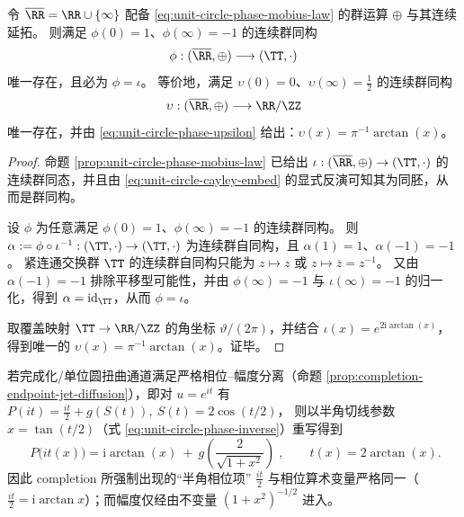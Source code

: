 \begin{corollary}\label{cor:unit-circle-phase-cayley-arctan-rigidity}
令 \(\overline{\RR}=\RR\cup\{\infty\}\) 配备 \eqref{eq:unit-circle-phase-mobius-law} 的群运算 \(\oplus\) 与其连续延拓。
则满足 \(\phi(0)=1\)、\(\phi(\infty)=-1\) 的连续群同构
\[
\phi:(\overline{\RR},\oplus)\longrightarrow (\TT,\cdot)
\]
唯一存在，且必为 \(\phi=\iota\)。
等价地，满足 \(\upsilon(0)=0\)、\(\upsilon(\infty)=\tfrac12\) 的连续群同构
\[
\upsilon:(\overline{\RR},\oplus)\longrightarrow \RR/\ZZ
\]
唯一存在，并由 \eqref{eq:unit-circle-phase-upsilon} 给出：\(\upsilon(x)=\pi^{-1}\arctan(x)\)。
\end{corollary}
\begin{proof}
命题 \ref{prop:unit-circle-phase-mobius-law} 已给出 \(\iota:(\overline{\RR},\oplus)\to(\TT,\cdot)\) 的连续群同态，并且由 \eqref{eq:unit-circle-cayley-embed} 的显式反演可知其为同胚，从而是群同构。
\par
设 \(\phi\) 为任意满足 \(\phi(0)=1\)、\(\phi(\infty)=-1\) 的连续群同构。
则 \(\alpha:=\phi\circ\iota^{-1}:(\TT,\cdot)\to(\TT,\cdot)\) 为连续群自同构，且 \(\alpha(1)=1\)、\(\alpha(-1)=-1\)。
紧连通交换群 \(\TT\) 的连续群自同构只能为 \(z\mapsto z\) 或 \(z\mapsto \overline{z}=z^{-1}\)。
又由 \(\alpha(-1)=-1\) 排除平移型可能性，并由 \(\phi(\infty)=-1\) 与 \(\iota(\infty)=-1\) 的归一化，得到 \(\alpha=\mathrm{id}_{\TT}\)，从而 \(\phi=\iota\)。
\par
取覆盖映射 \(\TT\to \RR/\ZZ\) 的角坐标 \(\vartheta/(2\pi)\)，并结合 \(\iota(x)=e^{2\mathrm{i}\arctan(x)}\)，得到唯一的 \(\upsilon(x)=\pi^{-1}\arctan(x)\)。证毕。
\end{proof}

\begin{remark}\label{rem:unit-circle-phase-completion-half-angle}
若完成化/单位圆扭曲通道满足严格相位--幅度分离（命题 \ref{prop:completion-endpoint-jet-diffusion}），即对 \(u=e^{it}\) 有
\(
P(it)=\frac{it}{2}+g(S(t)),\ S(t)=2\cos(t/2)
\)，
则以半角切线参数 \(x=\tan(t/2)\)（式 \eqref{eq:unit-circle-phase-inverse}）重写得到
\[
\boxed{\;
P\!\bigl(it(x)\bigr)
=\mathrm{i}\arctan(x)\ +\ g\!\left(\frac{2}{\sqrt{1+x^2}}\right)\;},
\qquad t(x)=2\arctan(x).
\]
因此 completion 所强制出现的“半角相位项” \(\frac{it}{2}\) 与相位算术变量严格同一（\(\frac{it}{2}=\mathrm{i}\arctan x\)）；而幅度仅经由不变量 \((1+x^2)^{-1/2}\) 进入。
\end{remark}
